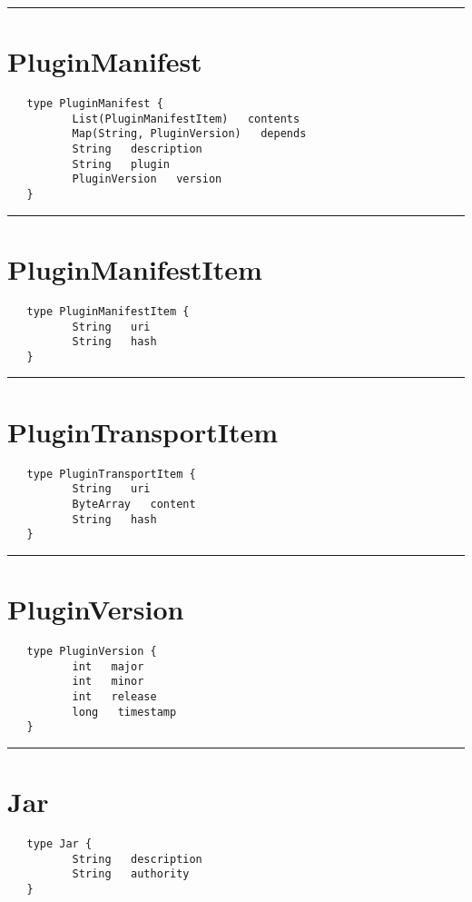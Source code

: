 \rule{15cm}{2pt}
\section{PluginManifest}
\label{type:PluginManifest}

\begin{verbatim}
   type PluginManifest {
          List(PluginManifestItem)   contents
          Map(String, PluginVersion)   depends
          String   description
          String   plugin
          PluginVersion   version
   }
\end{verbatim}

\rule{15cm}{2pt}
\section{PluginManifestItem}
\label{type:PluginManifestItem}

\begin{verbatim}
   type PluginManifestItem {
          String   uri
          String   hash
   }
\end{verbatim}

\rule{15cm}{2pt}
\section{PluginTransportItem}
\label{type:PluginTransportItem}

\begin{verbatim}
   type PluginTransportItem {
          String   uri
          ByteArray   content
          String   hash
   }
\end{verbatim}

\rule{15cm}{2pt}
\section{PluginVersion}
\label{type:PluginVersion}

\begin{verbatim}
   type PluginVersion {
          int   major
          int   minor
          int   release
          long   timestamp
   }
\end{verbatim}

\rule{15cm}{2pt}
\section{Jar}
\label{type:Jar}

\begin{verbatim}
   type Jar {
          String   description
          String   authority
   }
\end{verbatim}

